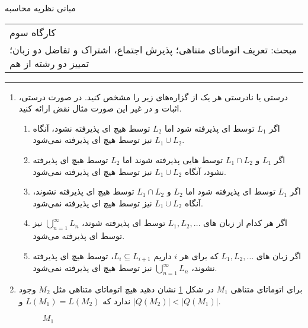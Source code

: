 \documentclass{article}
\begin{document}
	\begin{center}
		\Huge
		مبانی نظریه محاسبه
	\end{center}
	\Large
	\begin{tabularx}{\linewidth}{>{\raggedleft\arraybackslash}X}
		کارگاه سوم
		\\
		مبحث: تعریف اتوماتای متناهی؛ پذیرش اجتماع، اشتراک و تفاضل دو زبان؛ 
		 تمییز \LTRfootnote{distinguishability} دو رشته از هم
		\\
		
	\end{tabularx}
	\rule{\textwidth}{1pt}
	\large
	\begin{enumerate}
		\item 
				درستی یا نادرستی هر یک از گزاره‌های زیر را مشخص کنید. در صورت درستی، اثبات و در غیر این صورت مثال نقض ارائه کنید.
		\begin{enumerate}
			\item 
			اگر $L_1 $ توسط ای پذیرفته شود اما $L_2 $ توسط هیچ ای پذیرفته نشود، آنگاه $ L_1 \cup L_2 $ نیز توسط هیچ ای پذیرفته نمی‌شود.
			\item 
			اگر $L_1 $ و $ L_1 \cap L_2 $ توسط هایی پذیرفته شوند اما $L_2 $ توسط هیچ ای پذیرفته نشود، آنگاه $ L_1 \cup L_2 $ نیز توسط هیچ ای پذیرفته نمی‌شود.
			\item 
			اگر $L_1 $ توسط ای پذیرفته شود اما $L_2 $ و $ L_1 \cap L_2 $ توسط هیچ ای پذیرفته نشوند، آنگاه $ L_1 \cup L_2 $ نیز توسط هیچ ای پذیرفته نمی‌شود.
			\item 
		اگر هر کدام از زبان های
		$L_1, L_2 , \dots$  
		توسط ای پذیرفته شوند،
		$ \bigcup_{n = 1}^{\infty} L_n$
    نیز توسط ای پذیرفته می‌شود.
			\item 
	اگر زبان های
	$L_1, L_2 , \dots$
	که برای هر $i$ داریم 
	$L_i \subseteq L_{i+1} $، 
 توسط هیچ ای پذیرفته نشوند،
		$ \bigcup_{n = 1}^{\infty} L_n$
		 نیز توسط هیچ ای پذیرفته نمی‌شود.
			
		\end{enumerate}	
			
			
		\item 
 		برای اتوماتای متناهی $M_1$ در شکل  \ref{M1} نشان دهید هیچ اتوماتای متناهی مثل $ M_2 $ وجود ندارد که $L(M_1) = L(M_2)$ و $|Q(M_2)|<|Q(M_1)|$.
		\begin{figure}[h]
			\begin{minipage}{1\textwidth}
				\centering
				\caption{$M_1$}
				\label{M1}
			\end{minipage}%
		\end{figure}
		

\end{enumerate}
\end{document}
